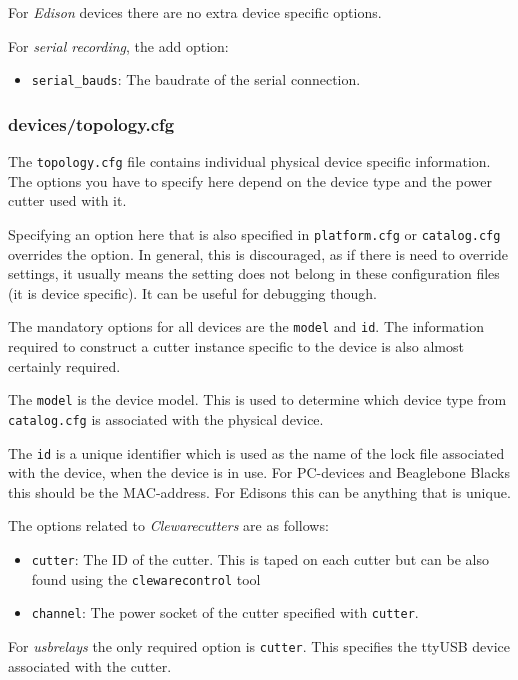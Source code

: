 \documentclass[a4paper,11pt]{article}
\newcommand{\cmd}[1]{\texttt{#1}}
\begin{document}
For \emph{Edison} devices there are no extra device specific options.

For \emph{serial recording}, the add option:
\begin{itemize}
	\item \cmd{serial\_bauds}: The baudrate of the serial connection.
\end{itemize}

\subsubsection*{devices/topology.cfg}

The \cmd{topology.cfg} file contains individual physical device specific information. The options you have to specify here depend on the device type and the power cutter used with it.

Specifying an option here that is also specified in \cmd{platform.cfg} or \cmd{catalog.cfg} overrides the option. In general, this is discouraged, as if there is need to override settings, it usually means the setting does not belong in these configuration files (it is device specific). It can be useful for debugging though.

The mandatory options for all devices are the \cmd{model} and \cmd{id}. The information required to construct a cutter instance specific to the device is also almost certainly required.

The \cmd{model} is the device model. This is used to determine which device type from \cmd{catalog.cfg} is associated with the physical device.

The \cmd{id} is a unique identifier which is used as the name of the lock file associated with the device, when the device is in use. For PC-devices and Beaglebone Blacks this should be the MAC-address. For Edisons this can be anything that is unique.

The options related to \emph{Clewarecutters} are as follows:
\begin{itemize}
\item \cmd{cutter}: The ID of the cutter. This is taped on each cutter but can be also found using the \cmd{clewarecontrol} tool
\item \cmd{channel}: The power socket of the cutter specified with \cmd{cutter}.
\end{itemize}

For \emph{usbrelays} the only required option is \cmd{cutter}. This specifies the ttyUSB device associated with the cutter.
\end{document}
